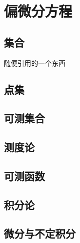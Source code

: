 \documentclass[12pt, a4paper, oneside, UTF8]{ctexbook}
\begin{document}
	\else
	\fi
	\chapter{偏微分方程}
	\section{集合}
	随便引用的一个东西\cite{choy20194d}
	
	\section{点集}
	
	\section{可测集合}
	
	\section{测度论}
	
	\section{可测函数}
	
	\section{积分论}
	
	\section{微分与不定积分}
	
	\ifx\allfiles\undefined
\end{document}
